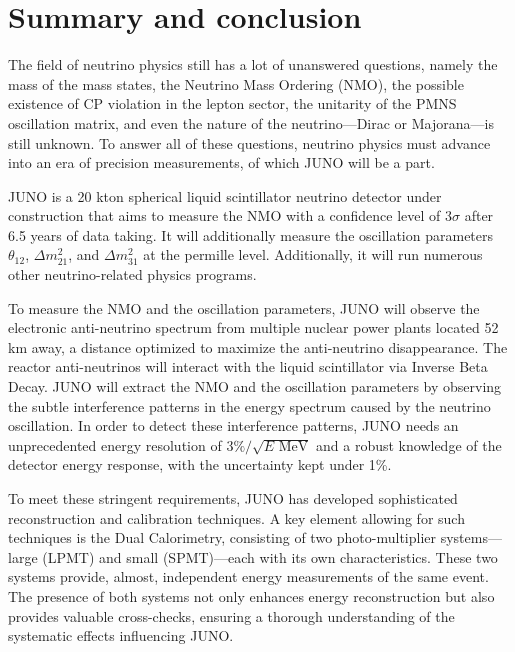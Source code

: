 \documentclass[../main.tex]{subfiles}
\begin{document}
\chapter*{Summary and conclusion}

The field of neutrino physics still has a lot of unanswered questions, namely the mass of the mass states, the Neutrino Mass Ordering (NMO), the possible existence of CP violation in the lepton sector, the unitarity of the PMNS oscillation matrix, and even the nature of the neutrino—Dirac or Majorana—is still unknown. To answer all of these questions, neutrino physics must advance into an era of precision measurements, of which JUNO will be a part.

JUNO is a 20 kton spherical liquid scintillator neutrino detector under construction that aims to measure the NMO with a confidence level of 3$\sigma$ after 6.5 years of data taking. It will additionally measure the oscillation parameters $\theta_{12}$, $\Delta m^2_{21}$, and $\Delta m^2_{31}$ at the permille level. Additionally, it will run numerous other neutrino-related physics programs.

To measure the NMO and the oscillation parameters, JUNO will observe the electronic anti-neutrino spectrum from multiple nuclear power plants located 52 km away, a distance optimized to maximize the anti-neutrino disappearance. The reactor anti-neutrinos will interact with the liquid scintillator via Inverse Beta Decay. JUNO will extract the NMO and the oscillation parameters by observing the subtle interference patterns in the energy spectrum caused by the neutrino oscillation.
In order to detect these interference patterns, JUNO needs an unprecedented energy resolution of $3\%/\sqrt{E \text{ MeV}}$ and a robust knowledge of the detector energy response, with the uncertainty kept under 1\%.

To meet these stringent requirements, JUNO has developed sophisticated reconstruction and calibration techniques. A key element allowing for such techniques is the Dual Calorimetry, consisting of two photo-multiplier systems—large (LPMT) and small (SPMT)—each with its own characteristics. These two systems provide, almost, independent energy measurements of the same event. The presence of both systems not only enhances energy reconstruction but also provides valuable cross-checks, ensuring a thorough understanding of the systematic effects influencing JUNO.
\end{document}
